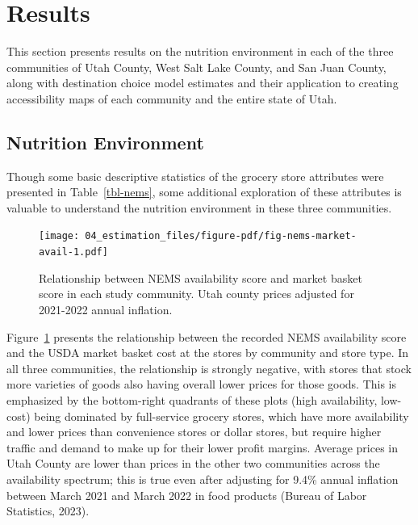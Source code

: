 \documentclass[
  letterpaper,
  authoryear,
  review,
  3p]{elsarticle}
\begin{document}

\hypertarget{sec-results}{%
\section{Results}\label{sec-results}}

This section presents results on the nutrition environment in each of
the three communities of Utah County, West Salt Lake County, and San
Juan County, along with destination choice model estimates and their
application to creating accessibility maps of each community and the
entire state of Utah.

\hypertarget{sec-nems}{%
\subsection{Nutrition Environment}\label{sec-nems}}

Though some basic descriptive statistics of the grocery store attributes
were presented in Table~\ref{tbl-nems}, some additional exploration of
these attributes is valuable to understand the nutrition environment in
these three communities.

\begin{figure}

{\centering \texttt{[image: 04\_estimation\_files/figure-pdf/fig-nems-market-avail-1.pdf]}

}

\caption{\label{fig-nems-market-avail}Relationship between NEMS
availability score and market basket score in each study community. Utah
county prices adjusted for 2021-2022 annual inflation.}

\end{figure}

Figure~\ref{fig-nems-market-avail} presents the relationship between the
recorded NEMS availability score and the USDA market basket cost at the
stores by community and store type. In all three communities, the
relationship is strongly negative, with stores that stock more varieties
of goods also having overall lower prices for those goods. This is
emphasized by the bottom-right quadrants of these plots (high
availability, low-cost) being dominated by full-service grocery stores,
which have more availability and lower prices than convenience stores or
dollar stores, but require higher traffic and demand to make up for
their lower profit margins. Average prices in Utah County are lower than
prices in the other two communities across the availability spectrum;
this is true even after adjusting for 9.4\% annual inflation between
March 2021 and March 2022 in food products (Bureau of Labor Statistics,
2023).
\end{document}
